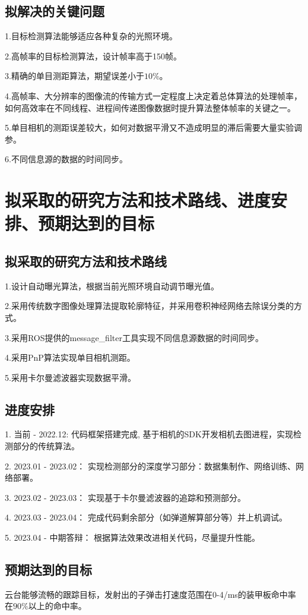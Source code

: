 \subsection{拟解决的关键问题}
1.目标检测算法能够适应各种复杂的光照环境。\par
2.高帧率的目标检测算法，设计帧率高于150帧。 \par
3.精确的单目测距算法，期望误差小于$10\%$。 \par
4.高帧率、大分辨率的图像流的传输方式一定程度上决定着总体算法的处理帧率，如何高效率在不同线程、进程间传递图像数据时提升算法整体帧率的关键之一。 \par
5.单目相机的测距误差较大，如何对数据平滑又不造成明显的滞后需要大量实验调参。 \par
6.不同信息源的数据的时间同步。\par
\section{拟采取的研究方法和技术路线、进度安排、预期达到的目标}
\subsection{拟采取的研究方法和技术路线}
1.设计自动曝光算法，根据当前光照环境自动调节曝光值。 \par
2.采用传统数字图像处理算法提取轮廓特征，并采用卷积神经网络去除误分类的方式。 \par
3.采用ROS提供的message\_filter工具实现不同信息源数据的时间同步。 \par
4.采用PnP算法实现单目相机测距。 \par
5.采用卡尔曼滤波器实现数据平滑。 \par
\subsection{进度安排}
1. 当前 - 2022.12: 代码框架搭建完成, 基于相机的SDK开发相机去图进程，实现检测部分的传统算法。 \par
2. 2023.01 - 2023.02： 实现检测部分的深度学习部分：数据集制作、网络训练、网络部署。\par
3. 2023.02 - 2023.03： 实现基于卡尔曼滤波器的追踪和预测部分。\par
4. 2023.03 - 2023.04： 完成代码剩余部分（如弹道解算部分等）并上机调试。\par
5. 2023.04 - 中期答辩： 根据算法效果改进相关代码，尽量提升性能。\par
\subsection{预期达到的目标}
云台能够流畅的跟踪目标，发射出的子弹击打速度范围在0-4/ms的装甲板命中率在$90\%$以上的命中率。
